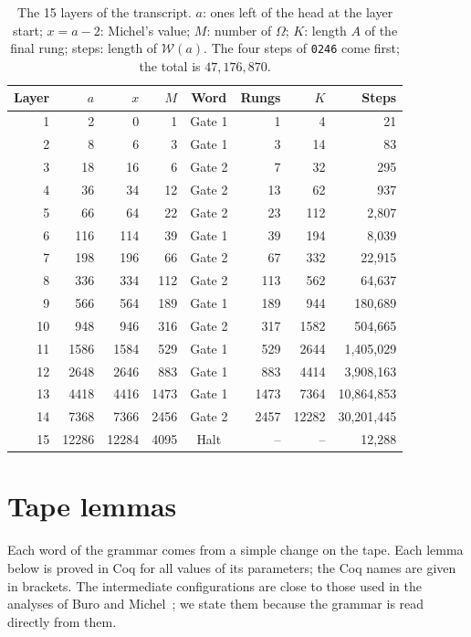 \documentclass[11pt]{article}
\theoremstyle{definition}
\theoremstyle{remark}
\newcommand{\W}{\mathcal{W}}
\begin{document}
\begin{table}[t]
\centering
\caption{The 15 layers of the transcript. $a$: ones left of the head at the layer
start; $x=a-2$: Michel's value; $M$: number of $\Omega$; $K$: length $A$ of the final
rung; steps: length of $\W(a)$. The four steps of \texttt{0246} come first; the total
is $47{,}176{,}870$.}
\label{tab:layers}
\small
\begin{tabular}{rrrrcrrr}
\toprule
Layer & $a$ & $x$ & $M$ & Word & Rungs & $K$ & Steps\\
\midrule
1  & 2     & 0     & 1    & Gate 1 & 1    & 4     & 21\\
2  & 8     & 6     & 3    & Gate 1 & 3    & 14    & 83\\
3  & 18    & 16    & 6    & Gate 2 & 7    & 32    & 295\\
4  & 36    & 34    & 12   & Gate 2 & 13   & 62    & 937\\
5  & 66    & 64    & 22   & Gate 2 & 23   & 112   & 2{,}807\\
6  & 116   & 114   & 39   & Gate 1 & 39   & 194   & 8{,}039\\
7  & 198   & 196   & 66   & Gate 2 & 67   & 332   & 22{,}915\\
8  & 336   & 334   & 112  & Gate 2 & 113  & 562   & 64{,}637\\
9  & 566   & 564   & 189  & Gate 1 & 189  & 944   & 180{,}689\\
10 & 948   & 946   & 316  & Gate 2 & 317  & 1582  & 504{,}665\\
11 & 1586  & 1584  & 529  & Gate 1 & 529  & 2644  & 1{,}405{,}029\\
12 & 2648  & 2646  & 883  & Gate 1 & 883  & 4414  & 3{,}908{,}163\\
13 & 4418  & 4416  & 1473 & Gate 1 & 1473 & 7364  & 10{,}864{,}853\\
14 & 7368  & 7366  & 2456 & Gate 2 & 2457 & 12282 & 30{,}201{,}445\\
15 & 12286 & 12284 & 4095 & Halt   & --   & --    & 12{,}288\\
\bottomrule
\end{tabular}
\end{table}

\section{Tape lemmas}\label{sec:lemmas}

Each word of the grammar comes from a simple change on the tape. Each lemma below is
proved in Coq for all values of its parameters; the Coq names are given in brackets.
The intermediate configurations are close to those used in the analyses of Buro and
Michel~\cite{buro,michel93}; we state them because the grammar is read directly from
them.
\end{document}
